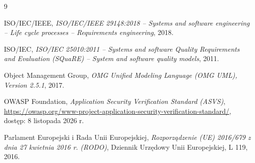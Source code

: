\documentclass[12pt,a4paper,oneside]{report}
\begin{document}
\begin{thebibliography}{9}

ISO/IEC/IEEE,
\textit{ISO/IEC/IEEE 29148:2018 -- Systems and software engineering -- Life cycle processes -- Requirements engineering},
2018.

ISO/IEC,
\textit{ISO/IEC 25010:2011 -- Systems and software Quality Requirements and Evaluation (SQuaRE) -- System and software quality models},
2011.

Object Management Group,
\textit{OMG Unified Modeling Language (OMG UML), Version 2.5.1},
2017.

OWASP Foundation,
\textit{Application Security Verification Standard (ASVS)},
\url{https://owasp.org/www-project-application-security-verification-standard/},
dostęp: 8 listopada 2026 r.

Parlament Europejski i Rada Unii Europejskiej,
\textit{Rozporządzenie (UE) 2016/679 z dnia 27 kwietnia 2016 r. (RODO)},
Dziennik Urzędowy Unii Europejskiej, L 119, 2016.

\end{thebibliography}
\end{document}
